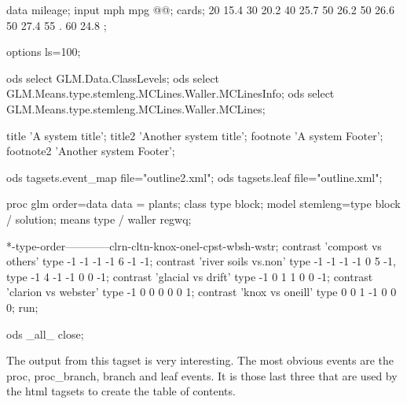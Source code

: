 \begin{sfvcode}
   data mileage;
      input mph mpg @@;
      cards;
   20 15.4 30 20.2 40 25.7 50 26.2 50 26.6 50 27.4 55  . 60 24.8
   ;

options ls=100;

ods select  GLM.Data.ClassLevels;
ods select  GLM.Means.type.stemleng.MCLines.Waller.MCLinesInfo;
ods select  GLM.Means.type.stemleng.MCLines.Waller.MCLines;


title 'A system title';
title2 'Another system title';
footnote 'A system Footer';
footnote2 'Another system Footer';

ods tagsets.event_map file="outline2.xml";
ods tagsets.leaf file="outline.xml";

   proc glm order=data data = plants;
      class type block;
      model stemleng=type block / solution;
      means type / waller regwq;

   *-type-order------------clrn-cltn-knox-onel-cpst-wbsh-wstr;
      contrast 'compost vs others'  type -1 -1 -1 -1  6 -1 -1;
      contrast 'river soils vs.non' type -1 -1 -1 -1  0  5 -1,
                                    type -1  4 -1 -1  0  0 -1;
      contrast 'glacial vs drift'   type -1  0  1  1  0  0 -1;
      contrast 'clarion vs webster' type -1  0  0  0  0  0  1;
      contrast 'knox vs oneill'     type  0  0  1 -1  0  0  0;
   run;
    
ods _all_ close;    
\end{sfvcode}

The output from this tagset is very interesting.  The most obvious
events are the proc, proc\_branch, branch and leaf events.  It is 
those last three that are used by the html tagsets to create the
table of contents.

